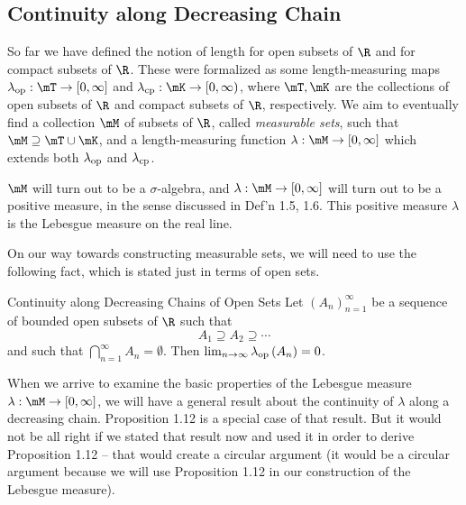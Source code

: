 \documentclass[pmath450]{subfiles}
\begin{document}
    \subsection{Continuity along Decreasing Chain}

    So far we have defined the notion of length for open subsets of $\R$ and for compact subsets of $\R$. These were formalized as some length-measuring maps $\lambda_{\op}:\mT\to\left[ 0,\infty \right]$ and $\lambda_{\cp}:\mK\to\left[ 0,\infty \right)$, where $\mT,\mK$ are the collections of open subsets of $\R$ and compact subsets of $\R$, respectively. We aim to eventually find a collection $\mM$ of subsets of $\R$, called \textit{measurable sets}, such that $\mM\supseteq\mT\cup\mK$, and a length-measuring function $\lambda:\mM\to\left[ 0,\infty \right]$ which extends both $\lambda_{\operatorname{op}}$ and $\lambda_{\operatorname{cp}}$.

    $\mM$ will turn out to be a $\sigma$-algebra, and $\lambda:\mM\to\left[ 0,\infty \right]$ will turn out to be a positive measure, in the sense discussed in Def'n 1.5, 1.6. This positive measure $\lambda$ is the Lebesgue measure on the real line.

    On our way towards constructing measurable sets, we will need to use the following fact, which is stated just in terms of open sets.

    \begin{prop}{Continuity along Decreasing Chains of Open Sets}
        Let $\left( A_{n} \right)^{\infty}_{n=1}$ be a sequence of bounded open subsets of $\R$ such that
        \begin{equation}
            A_1\supseteq A_2\supseteq\cdots
        \end{equation}
        and such that $\bigcap^{\infty}_{n=1}A_n=\emptyset$. Then $\lim_{n\to\infty}\lambda_{\operatorname{op}}\left( A_n \right)=0$.
    \end{prop}

    \rruleline

    \np When we arrive to examine the basic properties of the Lebesgue measure $\lambda:\mM\to\left[ 0,\infty \right]$, we will have a general result about the continuity of $\lambda$ along a decreasing chain. Proposition 1.12 is a special case of that result. But it would not be all right if we stated that result now and used it in order to derive Proposition 1.12 -- that would create a circular argument (it would be a circular argument because we will use Proposition 1.12 in our construction of the Lebesgue measure).
\end{document}
